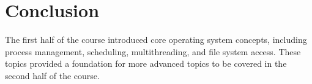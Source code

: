 \documentclass[12pt]{article}
\begin{document}
\section{Conclusion}
The first half of the course introduced core operating system concepts, including process management, scheduling, multithreading, and file system access. These topics provided a foundation for more advanced topics to be covered in the second half of the course.
\end{document}
